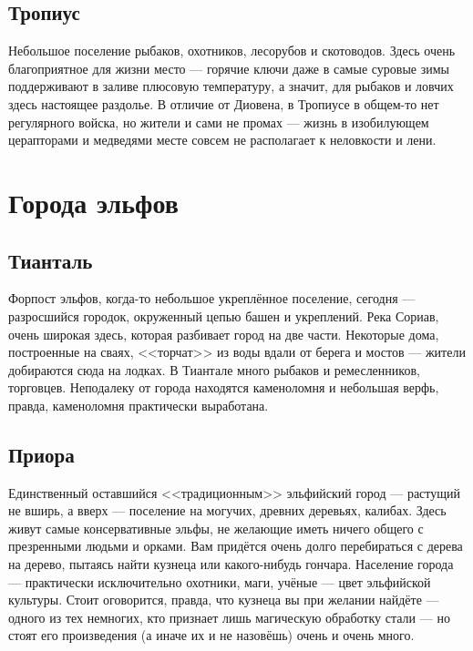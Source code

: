\documentclass[12pt,a4paper]{book}
\begin{document}
\subsection{Тропиус}

Небольшое поселение рыбаков, охотников, лесорубов и скотоводов. Здесь очень благоприятное для жизни место --- горячие ключи даже в самые суровые зимы поддерживают в заливе плюсовую температуру, а значит, для рыбаков и ловчих здесь настоящее раздолье. В отличие от Диовена, в Тропиусе в общем-то нет регулярного войска, но жители и сами не промах --- жизнь в изобилующем церапторами и медведями месте совсем не располагает к неловкости и лени.

\section{Города эльфов}

\subsection{Тианталь}

Форпост эльфов, когда-то небольшое укреплённое поселение, сегодня --- разросшийся городок, окруженный цепью башен и укреплений. Река Сориав, очень широкая здесь, которая разбивает город на две части. Некоторые дома, построенные на сваях, <<торчат>> из воды вдали от берега и мостов --- жители добираются сюда на лодках. В Тиантале много рыбаков и ремесленников, торговцев. Неподалеку от города находятся каменоломня и небольшая верфь, правда, каменоломня практически выработана.

\subsection{Приора}

Единственный оставшийся <<традиционным>> эльфийский город --- растущий не вширь, а вверх --- поселение на могучих, древних деревьях, калибах. Здесь живут самые консервативные эльфы, не желающие иметь ничего общего с презренными людьми и орками. Вам придётся очень долго перебираться с дерева на дерево, пытаясь найти кузнеца или какого-нибудь гончара. Население города --- практически исключительно охотники, маги, учёные --- цвет эльфийской культуры. Стоит оговорится, правда, что кузнеца вы при желании найдёте --- одного из тех немногих, кто признает лишь магическую обработку стали --- но стоят его произведения (а иначе их и не назовёшь) очень и очень много.
\end{document}
